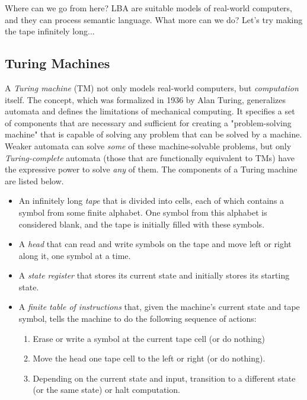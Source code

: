 Where can we go from here? LBA are suitable models of real-world computers, and they can process semantic language. What more can we do? Let's try making the tape infinitely long$\dots$

\subsection{Turing Machines}

A \textit{Turing machine} (TM) not only models real-world computers, but \textit{computation} itself. The concept, which was formalized in 1936 by Alan Turing, generalizes automata and defines the limitations of mechanical computing. It specifies a set of components that are necessary and sufficient for creating a "problem-solving machine" that is capable of solving any problem that can be solved by a machine. Weaker automata can solve \textit{some} of these machine-solvable problems, but only \textit{Turing-complete} automata (those that are functionally equivalent to TMs) have the expressive power to solve \textit{any} of them. The components of a Turing machine are listed below.

\vspace{4mm}
\begin{itemize}
    \item An infinitely long \textit{tape} that is divided into cells, each of which contains a symbol from some finite alphabet. One symbol from this alphabet is considered blank, and the tape is initially filled with these symbols.
    \item A \textit{head} that can read and write symbols on the tape and move left or right along it, one symbol at a time.
    \item A \textit{state register} that stores its current state and initially stores its starting state.
    \item A \textit{finite table of instructions} that, given the machine's current state and tape symbol, tells the machine to do the following sequence of actions:
    \begin{enumerate}
        \item Erase or write a symbol at the current tape cell (or do nothing)
        \item Move the head one tape cell to the left or right (or do nothing).
        \item Depending on the current state and input, transition to a different state (or the same state) or halt computation.
    \end{enumerate}
\end{itemize}
\vspace{5mm}

